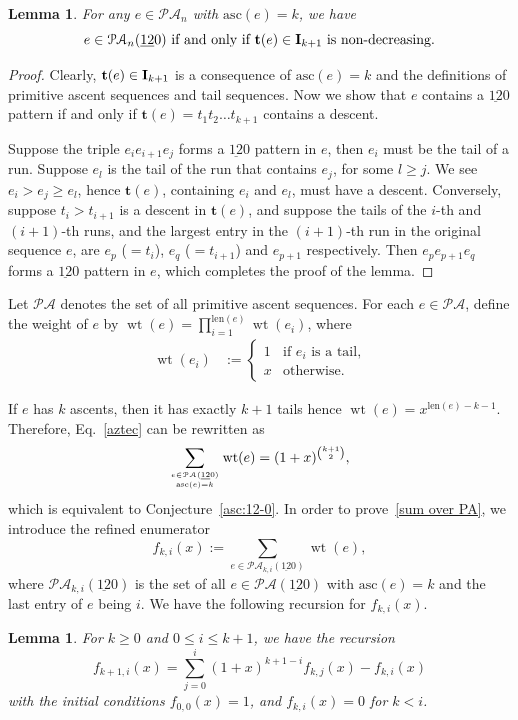 \documentclass[12pt,A4]{amsart}
\numberwithin{equation}{section}
\theoremstyle{plain}
\newtheorem{lemma}[theorem]{Lemma}
\theoremstyle{definition}
\def\PA{\mathcal{PA}}
\def\len{\mathrm{len}}
\def\asc{\mathrm{asc}}
\def\wt{\operatorname{wt}}
\def\I{\operatorname{{\bf I}}}
\def\tt{\mathbf{t}}
\begin{document}
\begin{lemma}\label{char:12-0}
For  any $e\in\PA_n$ with $\asc(e)=k$, we have
$$e\in\PA_n(\underline{12}0) \text{ if and only if $\tt(e)\in\I_{k+1}$ is non-decreasing.} $$
\end{lemma}
\begin{proof}
Clearly, $\tt(e)\in\I_{k+1}$ is a consequence  of $\asc(e)=k$ and the definitions of primitive ascent sequences and tail sequences. Now we show that $e$ contains a $\underline{12}0$ pattern if and only if $\tt(e)=t_1t_2\ldots t_{k+1}$ contains a descent.

Suppose the triple $e_ie_{i+1}e_j$ forms a $\underline{12}0$ pattern in $e$, then $e_i$ must be the tail of a run. Suppose $e_l$ is the tail of the run that contains $e_j$, for some $l\ge j$. We see $e_i>e_j\ge e_l$, hence $\tt(e)$, containing $e_i$ and $e_l$, must have a descent. Conversely, suppose $t_i>t_{i+1}$ is a descent in $\tt(e)$, and suppose the tails of the $i$-th and $(i+1)$-th runs, and the largest entry in the $(i+1)$-th run in the original sequence $e$, are $e_p$ ($=t_i$), $e_{q}$ ($=t_{i+1}$) and $e_{p+1}$ respectively. Then $e_pe_{p+1}e_q$ forms a $\underline{12}0$ pattern in $e$, which completes the proof of the lemma.
\end{proof}



Let $\PA$ denotes the set of all primitive ascent sequences. For each $e\in\PA$, define the weight of $e$ by $\wt(e) =\prod\limits_{i=1}^{\len(e)}\wt(e_i)$, where 
\begin{align*}
\wt(e_i)&:=\begin{cases}
1 & \text{if $e_i$ is a tail,}\\
x & \text{otherwise.}
\end{cases}
\end{align*}





If $e$ has $k$ ascents, then it has exactly $k+1$ tails hence $\wt(e)=x^{\len(e)-k-1}$.
Therefore, Eq.~\eqref{aztec} can be rewritten as
\begin{equation}\label{sum over PA}
 \sum_{{e\in\PA(\underline{12}0)}\atop{\asc(e)=k}}\wt(e)=(1+x)^{{k+1\choose 2}},
\end{equation}
which is equivalent to Conjecture~\ref{asc:12-0}.
In order to prove~\eqref{sum over PA}, we introduce the refined enumerator 
$$
f_{k,i}(x):=\sum_{e\in\PA_{k,i}(\underline{12}0)}\wt(e), 
$$
where $\PA_{k,i}(\underline{12}0)$ is the set of all $e\in\PA(\underline{12}0)$ with $\asc(e)=k$ and the last entry of $e$ being $i$. We have the following recursion for $f_{k,i}(x)$.
\begin{lemma}For $k\geq0$ and $0\leq i\leq k+1$, we have the recursion
\begin{equation}\label{rec:12-0}
f_{k+1,i}(x)=\sum_{j=0}^{i}(1+x)^{k+1-i}f_{k,j}(x)-f_{k,i}(x)
\end{equation}
with the initial conditions $f_{0,0}(x)=1$, and $f_{k,i}(x)=0$ for $k<i$.
\end{lemma}
\end{document}
